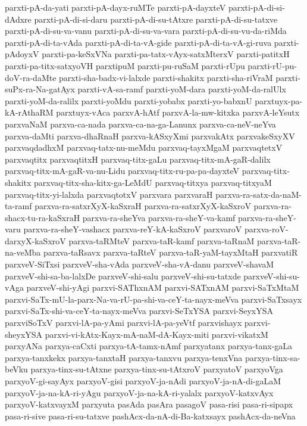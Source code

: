 {parxti-pA-da-yati
parxti-pA-dayx-ruMTe
parxti-pA-dayxteV
parxti-pA-di-si-dAdxre
parxti-pA-di-si-daru
parxti-pA-di-su-tAtxre
parxti-pA-di-su-tatxve
parxti-pA-di-su-va-vanu
parxti-pA-di-su-va-vara
parxti-pA-di-su-vu-da-riMda
parxti-pA-di-ta-vAda
parxti-pA-di-ta-vA-gide
parxti-pA-di-ta-vA-gi-ruva
parxti-pAdoyxV
parxti-pa-keSxVNa
parxti-pa-tatx-vAyx-satxMterxV
parxti-patitxH
parxti-pa-titx-satxyoVH
parxtipuM
parxti-pu-ruSaM
parxti-rUpu
parxti-rU-pu-doV-ra-daMte
parxti-sha-badx-vi-lalxde
parxti-shakitx
parxti-sha-riVraM
parxti-suPx-ra-Na-gatAyx
parxti-vA-sa-ramf
parxti-yoM-dara
parxti-yoM-da-ralUlx
parxti-yoM-da-ralilx
parxti-yoMdu
parxti-yobabx
parxti-yo-babxnU
parxtuyx-pa-kA-rAthaRM
parxtuyx-vAca
parxvA-hAtf
parxvA-la-mw-kitxka
parxvA-leYsutx
parxvaNaM
parxva-ca-nada
parxva-ca-na-ga-Lanunx
parxva-ca-neV-neYva
parxva-daMti
parxva-dhaRnaH
parxva-kASxyXmi
parxvakAtx
parxvakeSxyXV
parxvaqdadhxM
parxvaq-tatx-nu-meMdu
parxvaq-tayxMgaM
parxvaqtetxV
parxvaqtitx
parxvaqtitxH
parxvaq-titx-gaLu
parxvaq-titx-mA-gaR-dalilx
parxvaq-titx-mA-gaR-va-nu-Lidu
parxvaq-titx-ru-pa-pa-dayxteV
parxvaq-titx-shakitx
parxvaq-titx-sha-kitx-ga-LeMdU
parxvaq-titxya
parxvaq-titxyaM
parxvaq-titx-yi-lalxda
parxvaqtotxV
parxvara
parxvaraH
parxva-ra-satx-da-naM-ta-ramf
parxva-ra-satxrXyX-kaSxraH
parxva-ra-satxrXyX-kaSxroV
parxva-ra-shacx-tu-ra-kaSxraH
parxva-ra-sheYva
parxva-ra-sheY-va-kamf
parxva-ra-sheY-varu
parxva-ra-sheY-vashacx
parxva-reY-kA-kaSxroV
parxvaroV
parxva-roV-darxyX-kaSxroV
parxva-taRMteV
parxva-taR-kamf
parxva-taRnaM
parxva-taR-na-veMba
parxva-taRsavx
parxva-taRteV
parxva-taR-yaM-tayxMtaH
parxvatiR
parxveV-SiTxsi
parxveV-sha-vAda
parxveV-sha-vA-danu
parxveV-shavaM
parxveV-shi-sa-ba-lalxDe
parxveV-shi-salu
parxveV-shi-su-tatxde
parxveV-shi-su-vAga
parxveV-shi-yAgi
parxvi-SAThxnAM
parxvi-SATxnAM
parxvi-SaTxMtaM
parxvi-SaTx-mU-la-parx-Na-va-rU-pa-shi-va-ceY-ta-nayx-meVva
parxvi-SaTxsayx
parxvi-SaTx-shi-va-ceY-ta-nayx-meVva
parxvi-SeTxYSA
parxvi-SeyxYSA
parxviSoTxV
parxvi-lA-pa-yAmi
parxvi-lA-pa-yeVtf
parxvishayx
parxvi-sheyxYSA
parxvi-vi-kAtx-Kayx-mA-naM-dA-Kayx-miti
parxvi-vikatxM
parxyANa
parxya-caCxti
parxya-tA-tamx-nAmf
parxyatanx
parxya-tanx-gaLa
parxya-tanxkekx
parxya-tanxtaH
parxya-tanxvu
parxya-tenxVna
parxya-tinx-sa-beVku
parxya-tinx-su-tAtxne
parxya-tinx-su-tAtxroV
parxyatoV
parxyoVga
parxyoV-gi-sayAyx
parxyoV-gisi
parxyoV-ja-nAdi
parxyoV-ja-nA-di-gaLaM
parxyoV-ja-na-kA-ri-yAgu
parxyoV-ja-na-kA-ri-yalalx
parxyoV-katxvAyx
parxyoV-katxvayxM
parxyuta
pasAda
pasAra
pasagoV
pasa-risi
pasa-ri-sipapx
pasa-ri-sive
pasa-ri-su-tatxve
pashAcx-da-nA-di-Ba-katxsayx
pashAcx-da-neVna
}
